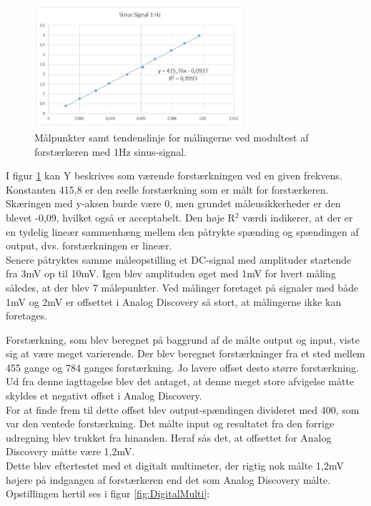 \begin{figure}[H]
	\centering
	\includegraphics[width=0.7\textwidth]{Figurer/Hardware/Sinusforstaerker}
	\caption{Målpunkter samt tendenslinje for målingerne ved modultest af forstærkeren med 1Hz sinus-signal.}
	\label{fig:SinusModul}
\end{figure}


I figur \ref{fig:SinusModul} kan Y beskrives som værende forstærkningen ved en given frekvens. Konstanten 415,8 er den reelle forstærkning som er målt for forstærkeren. Skæringen med y-aksen burde være 0, men grundet måleusikkerheder er den blevet -0,09, hvilket også er acceptabelt. Den høje R$^2$ værdi indikerer, at der er en tydelig lineær sammenhæng mellem den påtrykte spænding og spændingen af output, dvs. forstærkningen er lineær.\\[1ex]
Senere påtryktes samme måleopstilling et DC-signal med amplituder startende fra 3mV op til 10mV. Igen blev amplituden øget med 1mV for hvert måling således, at der blev 7 målepunkter. Ved målinger foretaget på signaler med både 1mV og 2mV er offsettet i Analog Discovery så stort, at målingerne ikke kan foretages.

Forstærkning, som blev beregnet på baggrund af de målte output og input, viste sig at være meget varierende. Der blev beregnet forstærkninger fra et sted mellem 455 gange og 784 ganges forstærkning. Jo lavere offset desto større forstærkning. Ud fra denne iagttagelse blev det antaget, at denne meget store afvigelse måtte skyldes et negativt offset i Analog Discovery. 
\\For at finde frem til dette offset blev output-spændingen divideret med 400, som var den ventede forstærkning. Det målte input og resultatet fra den forrige udregning blev trukket fra hinanden. Heraf sås det, at offsettet for Analog Discovery måtte være 1,2mV.\\
Dette blev eftertestet med et digitalt multimeter, der rigtig nok målte 1,2mV højere på indgangen af forstærkeren end det som Analog Discovery målte. Opstillingen hertil ses i figur \ref{fig:DigitalMulti}:

